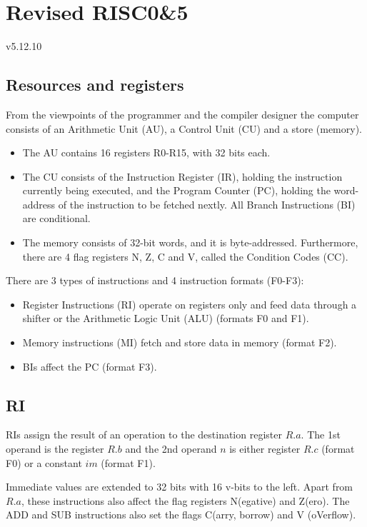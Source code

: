 \section{Revised RISC0\&5}
v5.12.10

\subsection{Resources and registers}
From the viewpoints of the programmer and the compiler designer the computer consists of an Arithmetic Unit (AU),
a Control Unit (CU) and a store (memory).
\begin{itemize}
  \item The AU contains 16 registers R0-R15, with 32 bits each.
  \item The CU consists of the Instruction Register (IR), holding the instruction currently being executed, and
    the Program Counter (PC), holding the word-address of the instruction to be fetched nextly. All Branch
    Instructions (BI) are conditional.
  \item The memory consists of 32-bit words, and it is byte-addressed. Furthermore, there are 4 flag registers N,
    Z, C and V, called the Condition Codes (CC).
\end{itemize}

There are 3 types of instructions and 4 instruction formats (F0-F3):
\begin{itemize}
  \item Register Instructions (RI) operate on registers only and feed data through a shifter or the
    Arithmetic Logic Unit (ALU) (formats F0 and F1).
  \item Memory instructions (MI) fetch and store data in memory (format F2).
  \item BIs affect the PC (format F3).
\end{itemize}

\subsection{RI}
RIs assign the result of an operation to the destination register $R.a$. The 1st operand is the register $R.b$
and the 2nd operand $n$ is either register $R.c$ (format F0) or a constant $im$ (format F1).

Immediate values are extended to 32 bits with 16 v-bits to the left. Apart from $R.a$, these instructions also
affect the flag registers N(egative) and Z(ero). The ADD and SUB instructions also set the flags C(arry, borrow)
and V (oVerflow).

